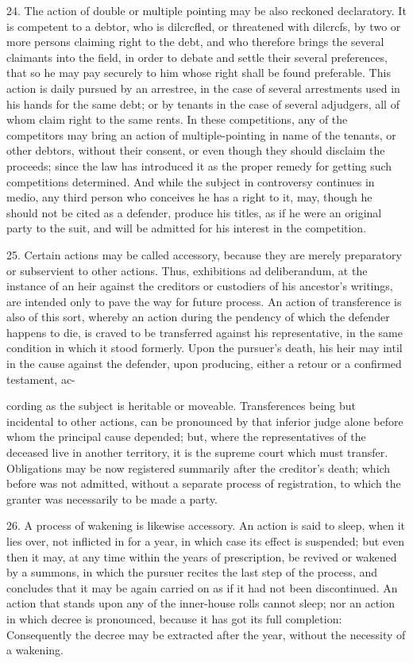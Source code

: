 \documentclass{article}
\begin{document}
24. The action of double or multiple pointing may be also reckoned declaratory. It is competent to a debtor, who is dilcrcfled, or threatened with dilcrcfs, by two or more persons claiming right to the debt, and who therefore brings the several claimants into the field, in order to debate and settle their several preferences, that so he may pay securely to him whose right shall be found preferable. This action is daily pursued by an arrestree, in the case of several arrestments used in his hands for the same debt; or by tenants in the case of several adjudgers, all of whom claim right to the same rents. In these competitions, any of the competitors may bring an action of multiple-pointing in name of the tenants, or other debtors, without their consent, or even though they should disclaim the proceeds; since the law has introduced it as the proper remedy for getting such competitions determined. And while the subject in controversy continues in medio, any third person who conceives he has a right to it, may, though he should not be cited as a defender, produce his titles, as if he were an original party to the suit, and will be admitted for his interest in the competition.

25. Certain actions may be called accessory, because they are merely preparatory or subservient to other actions. Thus, exhibitions ad deliberandum, at the instance of an heir against the creditors or custodiers of his ancestor's writings, are intended only to pave the way for future process. An action of transference is also of this sort, whereby an action during the pendency of which the defender happens to die, is craved to be transferred against his representative, in the same condition in which it stood formerly. Upon the pursuer's death, his heir may intil in the cause against the defender, upon producing, either a retour or a confirmed testament, ac-

cording as the subject is heritable or moveable. Transferences being but incidental to other actions, can be pronounced by that inferior judge alone before whom the principal cause depended; but, where the representatives of the deceased live in another territory, it is the supreme court which must transfer. Obligations may be now registered summarily after the creditor's death; which before was not admitted, without a separate process of registration, to which the granter was necessarily to be made a party.

26. A process of wakening is likewise accessory. An action is said to sleep, when it lies over, not inflicted in for a year, in which case its effect is suspended; but even then it may, at any time within the years of prescription, be revived or wakened by a summons, in which the pursuer recites the last step of the process, and concludes that it may be again carried on as if it had not been discontinued. An action that stands upon any of the inner-house rolls cannot sleep; nor an action in which decree is pronounced, because it has got its full completion: Consequently the decree may be extracted after the year, without the necessity of a wakening.
\end{document}

